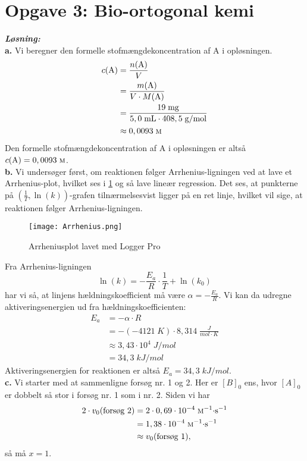 \documentclass{report}
\newcommand{\sol}{\setlength{\parindent}{0cm}\textbf{\textit{Løsning:}}\setlength{\parindent}{1cm}}
\begin{document}
\section*{Opgave 3: Bio-ortogonal kemi}
\sol \\
\textbf{a.}
Vi beregner den formelle stofmængdekoncentration af A i opløsningen.
\begin{equation*}
\begin{split}
  c(\ce{A} )&=\frac{n(\ce{A} )}{V}\\
  &=\frac{m(\ce{A} )}{V \cdot M(\ce{A})}\\
  &=\frac{19 \;\unit{mg} }{5,0 \;\unit{mL} \cdot 408,5 \;\unit{g/mol} }\\
  &\approx 0,0093 \;\unit{\textsc{m}} 
\end{split}
\end{equation*}
Den formelle stofmængdekoncentration af A i opløsningen er altså $c(\ce{A})=0,0093 \;\unit{\textsc{m}} $.\\[1ex]
\textbf{b.}
Vi undersøger først, om reaktionen følger Arrhenius-ligningen ved at lave et Arrhenius-plot, hvilket ses i \cref{fig:Arrhenius} og så lave lineær regression.
Det ses, at punkterne på $(\frac{1}{T}, \ln\left(k\right))$-grafen tilnærmelsesvist ligger på en ret linje, hvilket vil sige, at reaktionen følger Arrhenius-ligningen.
\begin{figure}[H]
\begin{center}
  \texttt{[image: Arrhenius.png]}
\end{center}
\caption{Arrheniusplot lavet med Logger Pro}
\label{fig:Arrhenius}
\end{figure}
Fra Arrhenius-ligningen
\[
\ln\left(k\right) = - \frac{E_a}{R} \cdot \frac{1}{T}+ \ln\left(k_0\right)
\] 
har vi så, at linjens hældningskoefficient må være $\alpha = -\frac{E_a}{R}$.
Vi kan da udregne aktiveringsenergien ud fra hældningskoefficienten:
\begin{equation*}
\begin{split}
  E_a&=-\alpha \cdot R \\
  &=-(-4121 \;\unit{K}) \cdot 8,314 \;\unit{\frac{J}{mol \cdot K}} \\
  &\approx 3,43 \cdot 10 ^{4}\;\unit{J/mol} \\
  &=34,3 \;\unit{kJ/mol}
\end{split}
\end{equation*}
Aktiveringsenergien for reaktionen er altså $E_a=34,3 \;\unit{kJ/mol}$.\\[1ex]
\textbf{c.}
Vi starter med at sammenligne forsøg nr. 1 og 2.
Her er $[B]_0$ ens, hvor $[A]_0$ er dobbelt så stor i forsøg nr. 1 som i nr. 2.
Siden vi har
\begin{equation*}
\begin{split}
  2 \cdot v_0(\text{forsøg 2})&= 2 \cdot 0,69 \cdot 10 ^{-4} \;\unit{\textsc{m}^{-1}\cdot s ^{-1}} \\
&=1,38\cdot 10 ^{-4} \;\unit{\textsc{m}^{-1}\cdot s ^{-1}}\\
  &\approx v_0(\text{forsøg 1}),
\end{split}
\end{equation*}
så må $x=1$.
\end{document}
